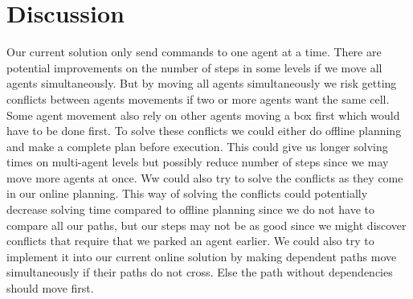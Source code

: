 \section{Discussion}
\label{sec:discussion}
Our current solution only send commands to one agent at a time.
There are potential improvements on the number of steps in some levels if we move all agents simultaneously.
But by moving all agents simultaneously we risk getting conflicts between agents movements if two or more agents want the same cell.
Some agent movement also rely on other agents moving a box first which would have to be done first.
To solve these conflicts we could either do offline planning and make a complete plan before execution.
This could give us longer solving times on multi-agent levels but possibly reduce number of steps since we may move more agents at once. %
Ww could also try to solve the conflicts as they come in our online planning.
This way of solving the conflicts could potentially decrease solving time compared to offline planning since we do not have to compare all our paths,
but our steps may not be as good since we might discover conflicts that require that we parked an agent earlier.
We could also try to implement it into our current online solution by making dependent paths move simultaneously if their paths do not cross.
Else the path without dependencies should move first.




